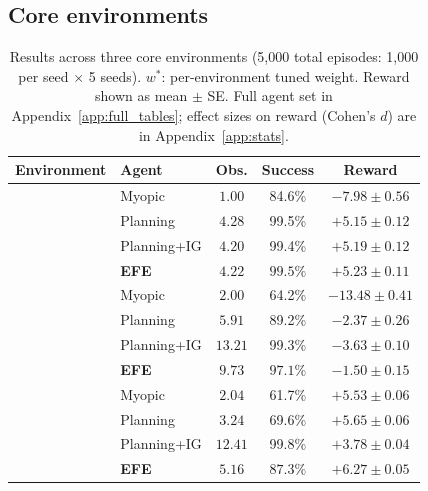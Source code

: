 \documentclass[runningheads]{llncs}
\begin{document}
\subsection{Core environments}

\begin{table}[ht]
\centering
\caption{Results across three core environments (5{,}000 total episodes: 1{,}000 per seed $\times$ 5 seeds). $w^*$: per-environment tuned weight. Reward shown as mean $\pm$ SE. Full agent set in Appendix~\ref{app:full_tables}; effect sizes on reward (Cohen's $d$) are in Appendix~\ref{app:stats}.}
\label{tab:main}
\begin{small}
\begin{tabular}{llccc}
\toprule
Environment & Agent & Obs. & Success & Reward \\
\midrule
{} & Myopic & $1.00$ & 84.6\% & $-7.98 \pm 0.56$ \\
& Planning & $4.28$ & 99.5\% & $+5.15 \pm 0.12$ \\
& Planning+IG & $4.20$ & 99.4\% & $+5.19 \pm 0.12$ \\
& \textbf{EFE} & $\mathbf{4.22}$ & $\mathbf{99.5\%}$ & $\mathbf{+5.23 \pm 0.11}$ \\
\midrule
{} & Myopic & $2.00$ & 64.2\% & $-13.48 \pm 0.41$ \\
& Planning & $5.91$ & 89.2\% & $-2.37 \pm 0.26$ \\
& Planning+IG & $13.21$ & 99.3\% & $-3.63 \pm 0.10$ \\
& \textbf{EFE} & $\mathbf{9.73}$ & $\mathbf{97.1\%}$ & $\mathbf{-1.50 \pm 0.15}$ \\
\midrule
{} & Myopic & $2.04$ & 61.7\% & $+5.53 \pm 0.06$ \\
& Planning & $3.24$ & 69.6\% & $+5.65 \pm 0.06$ \\
& Planning+IG & $12.41$ & 99.8\% & $+3.78 \pm 0.04$ \\
& \textbf{EFE} & $\mathbf{5.16}$ & $\mathbf{87.3\%}$ & $\mathbf{+6.27 \pm 0.05}$ \\
\bottomrule
\end{tabular}
\end{small}
\end{table}
\end{document}
